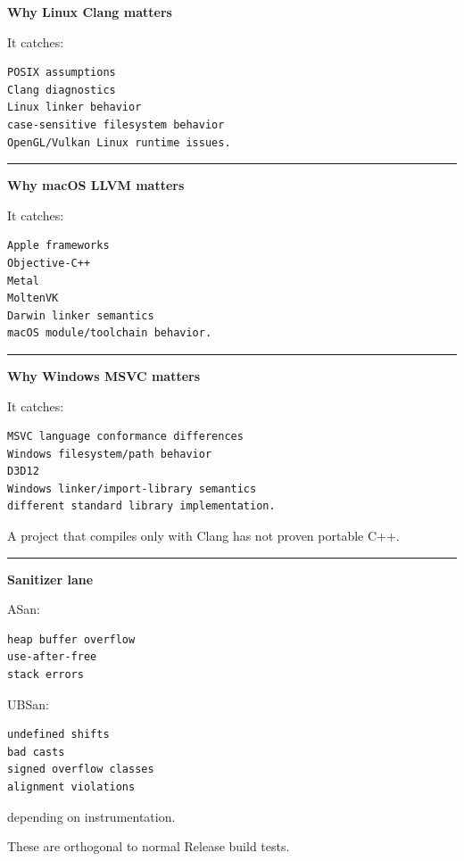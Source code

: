 \textbf{Why Linux Clang matters}

It catches:

\begin{verbatim}
POSIX assumptions
Clang diagnostics
Linux linker behavior
case-sensitive filesystem behavior
OpenGL/Vulkan Linux runtime issues.
\end{verbatim}

\begin{center}\rule{0.5\linewidth}{0.5pt}\end{center}

\textbf{Why macOS LLVM matters}

It catches:

\begin{verbatim}
Apple frameworks
Objective-C++
Metal
MoltenVK
Darwin linker semantics
macOS module/toolchain behavior.
\end{verbatim}

\begin{center}\rule{0.5\linewidth}{0.5pt}\end{center}

\textbf{Why Windows MSVC matters}

It catches:

\begin{verbatim}
MSVC language conformance differences
Windows filesystem/path behavior
D3D12
Windows linker/import-library semantics
different standard library implementation.
\end{verbatim}

A project that compiles only with Clang has not proven portable C++.

\begin{center}\rule{0.5\linewidth}{0.5pt}\end{center}

\textbf{Sanitizer lane}

ASan:

\begin{verbatim}
heap buffer overflow
use-after-free
stack errors
\end{verbatim}

UBSan:

\begin{verbatim}
undefined shifts
bad casts
signed overflow classes
alignment violations
\end{verbatim}

depending on instrumentation.

These are orthogonal to normal Release build tests.

